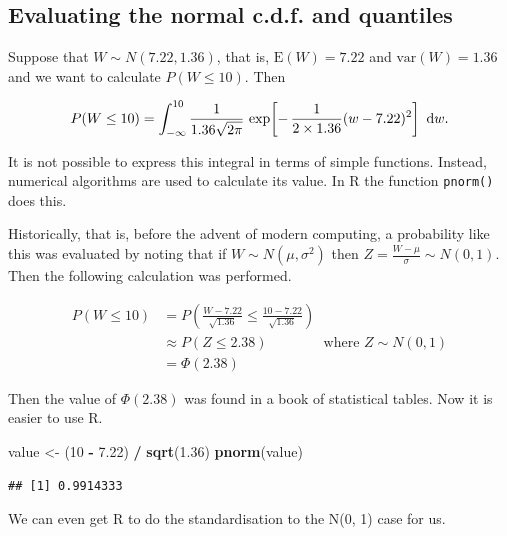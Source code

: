 \documentclass[
  british,
  11pt,
  openany, a4paper]{book}
\newenvironment{Shaded}{\begin{snugshade}}{\end{snugshade}}
\newcommand{\DecValTok}[1]{\textcolor[rgb]{0.00,0.00,0.81}{#1}}
\newcommand{\FloatTok}[1]{\textcolor[rgb]{0.00,0.00,0.81}{#1}}
\newcommand{\FunctionTok}[1]{\textcolor[rgb]{0.13,0.29,0.53}{\textbf{#1}}}
\newcommand{\NormalTok}[1]{#1}
\newcommand{\OtherTok}[1]{\textcolor[rgb]{0.56,0.35,0.01}{#1}}
\newcommand{\SpecialCharTok}[1]{\textcolor[rgb]{0.81,0.36,0.00}{\textbf{#1}}}
\begin{document}
\subsection{Evaluating the normal c.d.f. and quantiles}\label{evaluating-the-normal-c.d.f.-and-quantiles}

Suppose that \(W \sim N(7.22, 1.36)\), that is, \(\text{E}(W)=7.22\) and \(\text{var}(W)=1.36\) and we want to calculate \(P(W \leq 10)\). Then

\[
\begin{aligned}
P(W \leq 10) = \int_{-\infty}^{10} \displaystyle\frac{1}{1.36\sqrt{2\pi}} 
\,\exp\!\left[ -\,\frac{1}{2\times 1.36}(w-7.22)^2 \right] {\rm ~d}w. 
\end{aligned}
\]

It is not possible to express this integral in terms of simple functions. Instead, numerical algorithms are used to calculate its value. In R the function \texttt{pnorm()} does this.

Historically, that is, before the advent of modern computing, a probability like this was evaluated by noting that if \(W \sim N(\mu, \sigma^2)\) then \(Z = \displaystyle\frac{W - \mu}{\sigma} \sim N(0, 1)\). Then the following calculation was performed.

\[
\begin{aligned}
P(W \leq 10)
&= P\left(\frac{W-7.22}{\sqrt{1.36}} \leq \frac{10-7.22}{\sqrt{1.36}} \right) \\
&\approx P\left(Z \leq 2.38 \right) \qquad\qquad \text{where } Z \sim N(0, 1) \\
&= \Phi(2.38)
\end{aligned}
\]

Then the value of \(\Phi(2.38)\) was found in a book of statistical tables. Now it is easier to use R.

\begin{Shaded}
\begin{Highlighting}[]
\NormalTok{value }\OtherTok{\textless{}{-}}\NormalTok{ (}\DecValTok{10} \SpecialCharTok{{-}} \FloatTok{7.22}\NormalTok{) }\SpecialCharTok{/} \FunctionTok{sqrt}\NormalTok{(}\FloatTok{1.36}\NormalTok{)}
\FunctionTok{pnorm}\NormalTok{(value)}
\end{Highlighting}
\end{Shaded}

\begin{verbatim}
## [1] 0.9914333
\end{verbatim}

We can even get R to do the standardisation to the N(0, 1) case for us.
\end{document}
